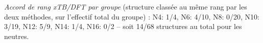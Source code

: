 \noindent\textit{Accord de rang xTB/DFT par groupe} (structure class\'ee au m\^eme rang par les deux m\'ethodes, sur l'effectif total du groupe) : N4: 1/4, N6: 4/10, N8: 0/20, N10: 3/19, N12: 5/9, N14: 1/4, N16: 0/2 -- soit 14/68 structures au total pour les neutres.